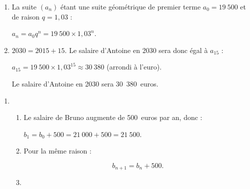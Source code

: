\begin{corrige}
\begin{enumerate}
          \begin{enumerate}[label=\alph*.]

               \item %
               La suite $(a_n)$ étant une suite géométrique de premier terme $a_0=19\ 500$ et de raison $q=1,03$ :
               \par
               $a_n = a_0q^n=19\ 500 \times 1,03^n$.
               \item %
               ${2030=2015+15}$. Le salaire d'Antoine en 2030 sera donc égal à $a_{15}$ :
               \par
               $a_{15}=19\ 500 \times 1,03^{15}\approx 30\ 380$ (arrondi à l'euro).
               \par
               Le salaire d'Antoine en 2030 sera 30~380~euros.
               \par
          \end{enumerate}
          \par
     \end{enumerate}
     \par
     \par
     \begin{enumerate}
          \item %
          \begin{enumerate}[label=\alph*.]
               \item %

               Le salaire de Bruno augmente de 500~euros par an, donc :
               \par
               $b_1=b_0+500=21\ 000+500=21\ 500$.

               \item %

               Pour la même raison :
               \par
               \[b_{n+1}=b_{n}+500.\]

               \item %


\end{enumerate}
\end{enumerate}
\end{corrige}
